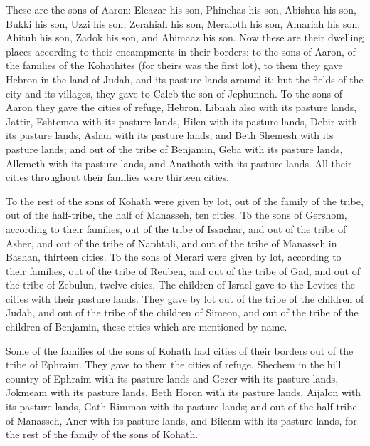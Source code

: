  These are the sons of Aaron: Eleazar his son, Phinehas
his son, Abishua his son,  Bukki his son, Uzzi his son,
Zerahiah his son,  Meraioth his son, Amariah his son,
Ahitub his son,  Zadok his son, and Ahimaaz his son.
 Now these are their dwelling places according to their
encampments in their borders: to the sons of Aaron, of the families of
the Kohathites (for theirs was the first lot),  to them
they gave Hebron in the land of Judah, and its pasture lands around it;
 but the fields of the city and its villages, they gave
to Caleb the son of Jephunneh.  To the sons of Aaron they
gave the cities of refuge, Hebron, Libnah also with its pasture lands,
Jattir, Eshtemoa with its pasture lands,  Hilen with its
pasture lands, Debir with its pasture lands,  Ashan with
its pasture lands, and Beth Shemesh with its pasture lands;
 and out of the tribe of Benjamin, Geba with its pasture
lands, Allemeth with its pasture lands, and Anathoth with its pasture
lands. All their cities throughout their families were thirteen cities.

 To the rest of the sons of Kohath were given by lot, out
of the family of the tribe, out of the half-tribe, the half of Manasseh,
ten cities.  To the sons of Gershom, according to their
families, out of the tribe of Issachar, and out of the tribe of Asher,
and out of the tribe of Naphtali, and out of the tribe of Manasseh in
Bashan, thirteen cities.  To the sons of Merari were
given by lot, according to their families, out of the tribe of Reuben,
and out of the tribe of Gad, and out of the tribe of Zebulun, twelve
cities.  The children of Israel gave to the Levites the
cities with their pasture lands.  They gave by lot out of
the tribe of the children of Judah, and out of the tribe of the children
of Simeon, and out of the tribe of the children of Benjamin, these
cities which are mentioned by name.

 Some of the families of the sons of Kohath had cities of
their borders out of the tribe of Ephraim.  They gave to
them the cities of refuge, Shechem in the hill country of Ephraim with
its pasture lands and Gezer with its pasture lands, 
Jokmeam with its pasture lands, Beth Horon with its pasture lands,
 Aijalon with its pasture lands, Gath Rimmon with its
pasture lands;  and out of the half-tribe of Manasseh,
Aner with its pasture lands, and Bileam with its pasture lands, for the
rest of the family of the sons of Kohath.

